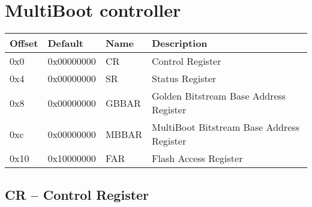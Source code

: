 \section{MultiBoot controller}
\label{app:memmap}

{
\begin{longtable}{l l l p{}}
\hline
\textbf{Offset} & \textbf{Default} & \textbf{Name} 
		& \textbf{Description} \\
\hline
\endfirsthead
\hline
\hline
\endhead
\hline
\endfoot
0x0 &  0x00000000 & CR & Control Register\\
0x4 &  0x00000000 & SR & Status Register\\
0x8 &  0x00000000 & GBBAR & Golden Bitstream Base Address Register\\
0xc &  0x00000000 & MBBAR & MultiBoot Bitstream Base Address Register\\
0x10 & 0x10000000 & FAR & Flash Access Register\\
\end{longtable}
}

\vspace{11pt}
\subsection{CR -- Control Register}
\label{app:memmap-cr}

\vspace{11pt}
\noindent
{}

